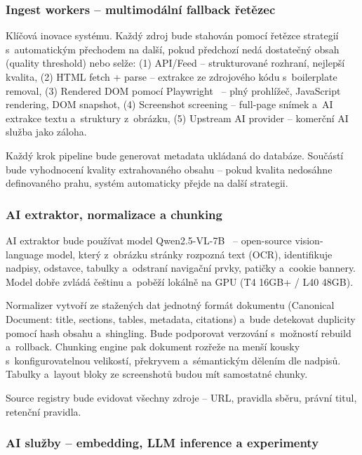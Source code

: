 \documentclass[a4paper, 11pt]{article}
\begin{document}
\subsubsection{Ingest workers -- multimodální fallback řetězec}

Klíčová inovace systému. Každý zdroj bude stahován pomocí řetězce strategií s~automatickým přechodem na další, pokud předchozí nedá dostatečný obsah (quality threshold) nebo selže: (1) API/Feed -- strukturované rozhraní, nejlepší kvalita, (2) HTML fetch + parse -- extrakce ze zdrojového kódu s~boilerplate removal, (3) Rendered DOM pomocí Playwright~\cite{playwright} -- plný prohlížeč, JavaScript rendering, DOM snapshot, (4) Screenshot screening -- full-page snímek a~AI extrakce textu a~struktury z~obrázku, (5) Upstream AI provider -- komerční AI služba jako záloha.

Každý krok pipeline bude generovat metadata ukládaná do databáze. Součástí bude vyhodnocení kvality extrahovaného obsahu -- pokud kvalita nedosáhne definovaného prahu, systém automaticky přejde na další strategii.

\subsubsection{AI extraktor, normalizace a chunking}

AI extraktor bude používat model Qwen2.5-VL-7B~\cite{qwen25vl} -- open-source vision-language model, který z~obrázku stránky rozpozná text (OCR), identifikuje nadpisy, odstavce, tabulky a~odstraní navigační prvky, patičky a~cookie bannery. Model dobře zvládá češtinu a~poběží lokálně na GPU (T4 16GB+ / L40 48GB).

Normalizer vytvoří ze stažených dat jednotný formát dokumentu (Canonical Document: title, sections, tables, metadata, citations) a~bude detekovat duplicity pomocí hash obsahu a~shingling. Bude podporovat verzování s~možností rebuild a~rollback. Chunking engine pak dokument rozřeže na menší kousky s~konfigurovatelnou velikostí, překryvem a~sémantickým dělením dle nadpisů. Tabulky a~layout bloky ze screenshotů budou mít samostatné chunky.

Source registry bude evidovat všechny zdroje -- URL, pravidla sběru, právní titul, retenční pravidla.

\subsubsection{AI služby -- embedding, LLM inference a experimenty}
\end{document}
